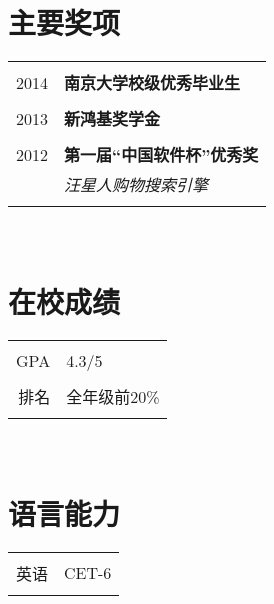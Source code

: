 \documentclass[10pt]{article} %
\begin{document}
\begin{minipage}[t]{0.32\textwidth}

\section{主要奖项} 

\begin{tabular}{rl}
& \\
2014  & \textbf{南京大学校级优秀毕业生}\\
& \\
2013  & \textbf{新鸿基奖学金}\\
& \\
2012	 & \textbf{第一届“中国软件杯”优秀奖}\\
& \textit{汪星人购物搜索引擎}\\ 
& \\
\end{tabular}\\[10pt]



\section{在校成绩} 

\begin{tabular}{rl}
& \\
\textsc{GPA}
& 4.3/5 \\
& \\
\textsc{排名}
& 全年级前20\% \\
& \\
\end{tabular}\\[10pt]


\section{语言能力} 

\begin{tabular}{rl}
& \\
\textsc{英语}
& CET-6 \\
& \\
\end{tabular}\\[10pt]


\end{minipage}
\end{document}
